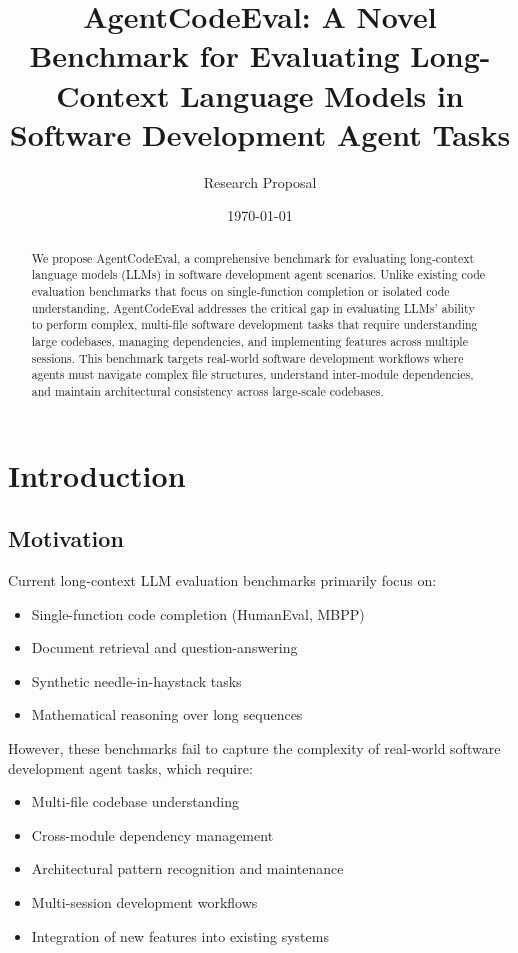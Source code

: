 \documentclass{article}
\title{AgentCodeEval: A Novel Benchmark for Evaluating Long-Context Language Models in Software Development Agent Tasks}
\author{Research Proposal}
\date{\today}
\begin{document}
\maketitle

\begin{abstract}
We propose AgentCodeEval, a comprehensive benchmark for evaluating long-context language models (LLMs) in software development agent scenarios. Unlike existing code evaluation benchmarks that focus on single-function completion or isolated code understanding, AgentCodeEval addresses the critical gap in evaluating LLMs' ability to perform complex, multi-file software development tasks that require understanding large codebases, managing dependencies, and implementing features across multiple sessions. This benchmark targets real-world software development workflows where agents must navigate complex file structures, understand inter-module dependencies, and maintain architectural consistency across large-scale codebases.
\end{abstract}

\section{Introduction}

\subsection{Motivation}
Current long-context LLM evaluation benchmarks primarily focus on:
\begin{itemize}
    \item Single-function code completion (HumanEval, MBPP)
    \item Document retrieval and question-answering
    \item Synthetic needle-in-haystack tasks
    \item Mathematical reasoning over long sequences
\end{itemize}

However, these benchmarks fail to capture the complexity of real-world software development agent tasks, which require:
\begin{itemize}
    \item Multi-file codebase understanding
    \item Cross-module dependency management
    \item Architectural pattern recognition and maintenance
    \item Multi-session development workflows
    \item Integration of new features into existing systems
\end{itemize}
\end{document}
